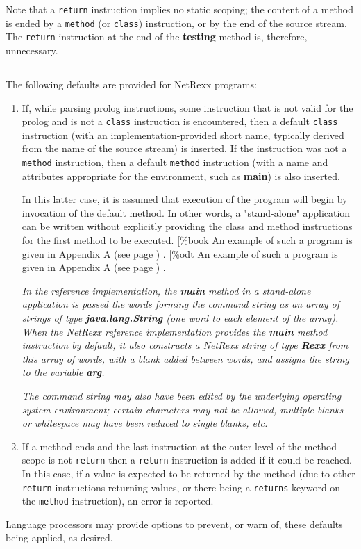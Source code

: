Note that a \texttt{return} instruction implies no static scoping; the
content of a method is ended by a \texttt{method} (or \texttt{class})
instruction, or by the end of the source stream.
The \texttt{return} instruction at the end of the \textbf{testing}
method is, therefore, unnecessary.
\subsection{}\label{"id"}
 
The following defaults are provided for NetRexx programs:
\begin{enumerate}
\item If, while parsing prolog instructions, some instruction that is not
valid for the prolog and is not a \texttt{class} instruction is
encountered, then a default \texttt{class} instruction (with an
implementation-provided short name, typically derived from the name of
the source stream) is inserted.  If the instruction was not a
\texttt{method} instruction, then a default \texttt{method} instruction
(with a name and attributes appropriate for the environment, such
as \textbf{main}) is also inserted.
 
In this latter case, it is assumed that execution of the program will
begin by invocation of the default method.
In other words, a "stand-alone" application can be written without
explicitly providing the class and method instructions for the first
method to be executed.
[\%book
An example of such a program is given in  Appendix A (see page \pageref{refappa}) .
[\%odt
An example of such a program is given in  Appendix A (see page \pageref{refappa}) .
 
\emph{In the reference implementation, the \textbf{main} method in a
stand-alone application is passed the words forming the command string
as an array of strings of type \textbf{java.lang.String} (one word to
each element of the array).
When the NetRexx reference implementation provides the \textbf{main}
method instruction by default, it also constructs a NetRexx string of
type \textbf{Rexx} from this array of words, with a blank added
between words, and assigns the string to the variable
\textbf{arg}.}
 
\emph{The command string may also have been edited by the underlying
operating system environment; certain characters may not be
allowed, multiple blanks or whitespace may have been reduced to
single blanks, etc.
}
\item If a method ends and the last instruction at the outer level of the
method scope is not \texttt{return} then a \texttt{return} instruction
is added if it could be reached.
In this case, if a value is expected to be returned by the method (due
to other \texttt{return} instructions returning values, or there being a
\texttt{returns} keyword on the \texttt{method} instruction), an error
is reported.
\end{enumerate}
 
Language processors may provide options to prevent, or warn of, these
defaults being applied, as desired.
